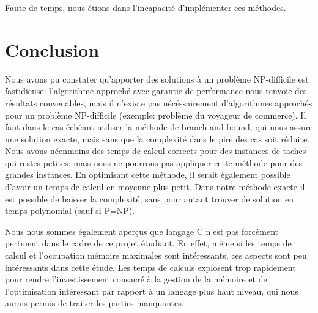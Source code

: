 \documentclass[12pt]{article}
\begin{document}
Faute de temps, nous étions dans l'incapacité d'implémenter ces méthodes.
\clearpage
\newpage
\section{Conclusion}


Nous avons pu constater qu'apporter des solutions à un problème NP-difficile est fastidieuse: l'algorithme approché avec garantie de performance nous renvoie des résultats convenables, mais il n'existe pas nécéssairement d'algorithmes approchés pour un problème NP-difficile (exemple: problème du voyageur de commerce). Il faut dans le cas échéant utiliser la méthode de branch and bound, qui nous assure une solution exacte, mais sans que la complexité dans le pire des cas soit réduite. Nous avons néenmoins des temps de calcul corrects pour des instances de taches qui restes petites, mais nous ne pourrons pas appliquer cette méthode pour des grandes instances. En optimisant cette méthode, il serait également possible d'avoir un temps de calcul en moyenne plus petit. Dans notre méthode exacte il est possible de baisser la complexité, sans pour autant trouver de solution en temps polynomial (sauf si P=NP). 
  
Nous nous sommes également aperçus que langage C n'est pas forcément pertinent dans le cadre de ce projet étudiant. En effet, même si les temps de calcul et l'occupation mémoire maximales sont intéressants, ces aspects sont peu intéressants dans cette étude. Les temps de calculs explosent trop rapidement pour rendre l'investissement consacré à la gestion de la mémoire et de l'optimisation intéressant par rapport à un langage plus haut niveau, qui nous aurais permis de traiter les parties manquantes.\\



\end{document}
